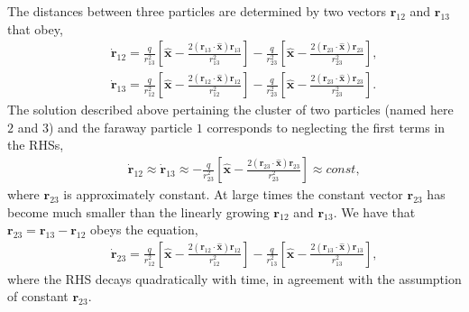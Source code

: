 The distances between three particles are determined by two vectors $\bm r_{12}$ and $\bm r_{13}$ that obey,
\begin{eqnarray}&&\!\!\!\!\!\!\!\!
\dot{\bm r}_{12}\!=\!\frac{q}{r_{13}^2}\left[\bm {\hat x}\!-\!\frac{2 \left(\bm r_{13}\!\cdot\!\bm {\hat x}\right) \bm r_{13}}{r_{13}^2}\right]\!-\!\frac{q}{r_{23}^2}\left[\bm {\hat x}\!-\!\frac{2 \left(\bm r_{23}\!\cdot\!\bm {\hat x}\right) \bm r_{23}}{r_{23}^2}\right],\nonumber\\&&\!\!\!\!\!\!\!\!
\dot{\bm r}_{13}\! =\!\frac{q}{r_{12}^2}\left[\bm {\hat x}\!-\!\frac{2 \left(\bm r_{12}\!\cdot\!\bm {\hat x}\right) \bm r_{12}}{r_{12}^2}\right]\!-\!\frac{q}{r_{23}^2}\left[\bm {\hat x}\!-\!\frac{2 \left(\bm r_{23}\!\cdot\!\bm {\hat x}\right) \bm r_{23}}{r_{23}^2}\right]\!.\label{grv}
\end{eqnarray}
The  solution described above pertaining the cluster of two particles (named here $2$ and $3$) and the faraway particle $1$ corresponds to neglecting the first terms in the RHSs,
\begin{eqnarray}&&\!\!\!\!\!\!\!\!\!\!\!\!\!\!\!\!
\dot{\bm r}_{12}\approx \dot{\bm r}_{13}\approx -\frac{q}{r_{23}^2}\left[\bm {\hat x}\!-\!\frac{2 \left(\bm r_{23}\!\cdot\!\bm {\hat x}\right) \bm r_{23}}{r_{23}^2}\right]\approx const,\label{clust}
\end{eqnarray}
where $\bm r_{23}$ is approximately constant. At large times the constant vector $\bm r_{23}$ has become much smaller than the linearly growing ${\bm r}_{12}$ and ${\bm r}_{13}$. We have that $\bm r_{23}={\bm r}_{13}-{\bm r}_{12}$ obeys the equation,
\begin{eqnarray}&&\!\!\!\!\!\!\!\!
\dot{\bm r}_{23}\!=\!\frac{q}{r_{12}^2}\left[\bm {\hat x}\!-\!\frac{2 \left(\bm r_{12}\!\cdot\!\bm {\hat x}\right) \bm r_{12}}{r_{12}^2}\right]\!-\!\frac{q}{r_{13}^2}\left[\bm {\hat x}\!-\!\frac{2 \left(\bm r_{13}\!\cdot\!\bm {\hat x}\right) \bm r_{13}}{r_{13}^2}\right],\nonumber
\end{eqnarray}
where the RHS decays quadratically with time, in agreement with the assumption of constant  $\bm r_{23}$.

